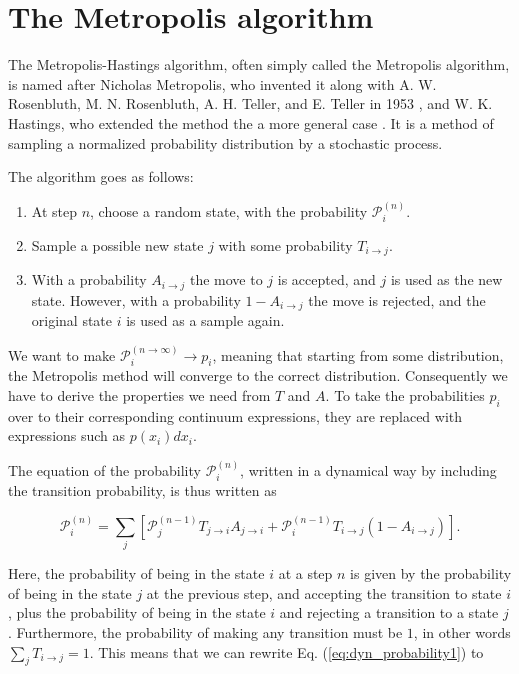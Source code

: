 \section{The Metropolis algorithm}
	The Metropolis-Hastings algorithm, often simply called the Metropolis algorithm, is named after Nicholas Metropolis, who invented it along with A. W. Rosenbluth, M. N. Rosenbluth, A. H. Teller, and E. Teller in 1953 \cite{Metropolis53}, and W. K. Hastings, who extended the method the a more general case \cite{hastings1970}. It is a method of sampling a normalized probability distribution by a stochastic process. 

	The algorithm goes as follows:
	\begin{enumerate}
		\item At step $n$, choose a random state, with the probability $\mathcal{P}_{i}^{(n)}$.
		\item Sample a possible new state $j$ with some probability $T_{i\rightarrow j}$.
		\item With a probability $A_{i\rightarrow j}$ the move to $j$ is accepted, and $j$ is used as the new state. However, with a probability $1-A_{i\rightarrow j}$ the move is rejected, and the original state $i$ is used as a sample again.
	\end{enumerate}

	We want to make $\mathcal{P}_{i}^{(n\rightarrow\infty)}\rightarrow p_{i}$, meaning that starting from some distribution, the Metropolis method will converge to the correct distribution. Consequently we have to derive the properties we need from $T$ and $A$. To take the probabilities $p_{i}$ over to their corresponding continuum expressions, they are replaced with expressions such as $p(x_{i})dx_{i}$.

	The equation of the probability $\mathcal{P}_{i}^{(n)}$, written in a dynamical way by including the transition probability, is thus written as
	
	\begin{equation} \label{eq:dyn_probability1}
		{\mathcal P}^{(n)}_i = \sum_{j} \left [
		{\mathcal P}^{(n-1)}_jT_{j\rightarrow i} A_{j\rightarrow i} 
		+{\mathcal P}^{(n-1)}_iT_{i\rightarrow j}\left ( 1- A_{i\rightarrow j} \right)
		\right ] .
	\end{equation}
	
	Here, the probability of being in the state $i$ at a step $n$ is given by the probability of being in the state $j$ at the previous step, and accepting the transition to state $i$, plus the probability of being in the state $i$ and rejecting a transition to a state $j$. Furthermore, the probability of making any transition must be $1$, in other words $\sum_{j}T_{i\rightarrow j}=1$. This means that we can rewrite Eq. (\ref{eq:dyn_probability1}) to
	
